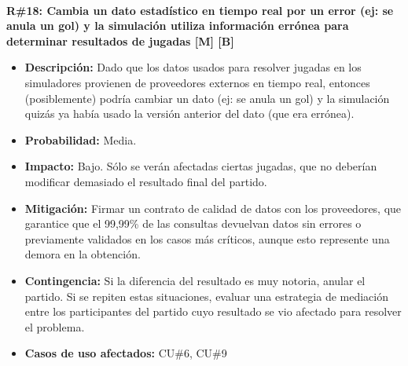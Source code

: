 ~

\noindent\textbf{R\#18: Cambia un dato estadístico en tiempo real por un error (ej: se anula un gol) y la simulación utiliza información errónea para determinar resultados de jugadas [M] [B] } 
\begin{itemize}
	\item{\textbf{Descripción:} Dado que los datos usados para resolver jugadas en los simuladores provienen de proveedores externos en tiempo real, entonces (posiblemente) podría cambiar un dato (ej: se anula un gol) y la simulación quizás ya había usado la versión anterior del dato (que era errónea).}
	\item{\textbf{Probabilidad:} Media.}
	\item{\textbf{Impacto:} Bajo. Sólo se verán afectadas ciertas jugadas, que no deberían modificar demasiado el resultado final del partido.}
	\item{\textbf{Mitigación:} Firmar un contrato de calidad de datos con los proveedores, que garantice que el 99,99\% de las consultas devuelvan datos sin errores o previamente validados en los casos más críticos, aunque esto represente una demora en la obtención.}
	\item{\textbf{Contingencia:} Si la diferencia del resultado es muy notoria, anular el partido. Si se repiten estas situaciones, evaluar una estrategia de mediación entre los participantes del partido cuyo resultado se vio afectado para resolver el problema.}
	\item{\textbf{Casos de uso afectados:} CU\#6, CU\#9}
\end{itemize}

~

